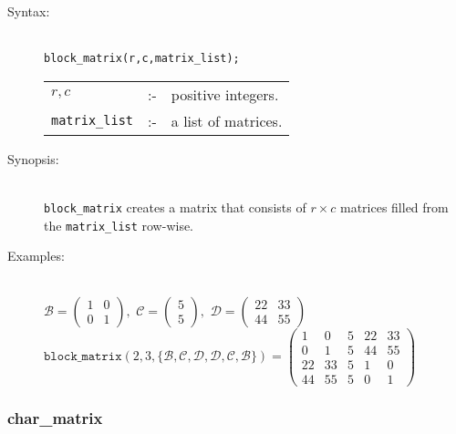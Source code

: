 \begin{description}

\item[Syntax:]\mbox{}\\
\texttt{block\_matrix(r,c,matrix\_list);}\\[2mm]
\begin{tabular}{l l l}
$r,c$          &:-& positive integers. \\
\texttt{matrix\_list} &:-& a list of matrices.
\end{tabular}

\item[Synopsis:]\mbox{}\\
\texttt{block\_matrix} creates a matrix that consists of $r\times c$ matrices
filled from the \texttt{matrix\_list} row-wise.

\item[Examples:]\mbox{}\\
  \(\mathcal{B} = \begin{pmatrix} 1 & 0 \\ 0 & 1 \end{pmatrix}, \,\,
  \mathcal{C} = \begin{pmatrix} 5 \\ 5 \end{pmatrix}, \,\,
  \mathcal{D} = \begin{pmatrix} 22 & 33 \\ 44 & 55 \end{pmatrix}\) \\[2mm]
  \(\texttt{block\_matrix}(2,3,\{\mathcal{B,C,D,D,C,B}\})  =
  \begin{pmatrix} 1 & 0 & 5 & 22 & 33 \\ 0 & 1 & 5 & 44 & 55 \\
    22 & 33 & 5 & 1 & 0 \\ 44 & 55 & 5 & 0 & 1 \end{pmatrix}\)
\end{description}


\subsubsection{char\_matrix}
\label{linalg:char_matrix}

